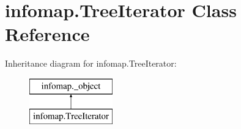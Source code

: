 \hypertarget{classinfomap_1_1TreeIterator}{}\section{infomap.\+Tree\+Iterator Class Reference}
\label{classinfomap_1_1TreeIterator}
Inheritance diagram for infomap.\+Tree\+Iterator\+:\begin{figure}[H]
\begin{center}
\leavevmode
\includegraphics[height=2.000000cm]{classinfomap_1_1TreeIterator}
\end{center}
\end{figure}
